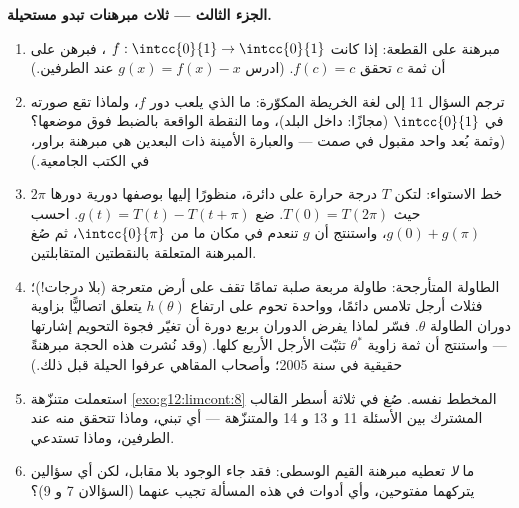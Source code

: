 \begin{problem}
\medskip
\noindent\textbf{الجزء الثالث --- ثلاث مبرهنات تبدو
مستحيلة.}
\begin{enumerate}[resume]
  \item مبرهنة  على القطعة: إذا كانت
        $f : \intcc{0}{1} \to \intcc{0}{1}$ ، فبرهن
        على أن ثمة $c$ تحقق $f(c) = c$. (ادرس
        $g(x) = f(x) - x$ عند الطرفين.)
  \item ترجم السؤال 11 إلى لغة الخريطة المكوّرة: ما الذي يلعب
        دور $f$، ولماذا تقع صورته في
        $\intcc{0}{1}$ (مجازًا: داخل البلد)، وما
        النقطة الواقعة بالضبط فوق موضعها؟ (وثمة
        بُعد واحد مقبول في صمت --- والعبارة الأمينة ذات
        البعدين هي مبرهنة براور، في الكتب
        الجامعية.)
  \item خط الاستواء: لتكن $T$ درجة حرارة  على
        دائرة، منظورًا إليها بوصفها  دورية دورها $2\pi$ حيث
        $T(0) = T(2\pi)$. ضع $g(t) = T(t) - T(t + \pi)$.
        احسب $g(0) + g(\pi)$، واستنتج أن $g$ تنعدم
        في مكان ما من $\intcc{0}{\pi}$، ثم صُغ المبرهنة
        المتعلقة بالنقطتين المتقابلتين.
  \item الطاولة المتأرجحة: طاولة مربعة صلبة تمامًا تقف
        على أرض متعرجة  (بلا درجات!)؛ فثلاث أرجل
        تلامس دائمًا، وواحدة تحوم على ارتفاع $h(\theta)$
        يتعلق اتصاليًّا بزاوية دوران الطاولة
        $\theta$. فسّر لماذا يفرض الدوران بربع دورة
        أن تغيّر فجوة التحويم إشارتها --- واستنتج أن
        ثمة زاوية $\theta^*$ تثبّت الأرجل الأربع كلها. (وقد نُشرت هذه
        الحجة مبرهنةً حقيقية في سنة 2005؛
        وأصحاب المقاهي عرفوا الحيلة قبل ذلك.)
  \item استعملت متنزّهة \cref{exo:g12:limcont:8} المخطط
        نفسه. صُغ في ثلاثة أسطر القالب المشترك بين الأسئلة 11 و 13
        و 14 والمتنزّهة --- أي  تبني، وماذا تتحقق منه
        عند الطرفين، وماذا تستدعي.
  \item ما \emph{لا} تعطيه مبرهنة القيم الوسطى: فقد جاء الوجود بلا مقابل،
        لكن أي سؤالين يتركهما مفتوحين، وأي أدوات في هذه
        المسألة تجيب عنهما (السؤالان 7 و 9)؟
\end{enumerate}


\end{problem}
